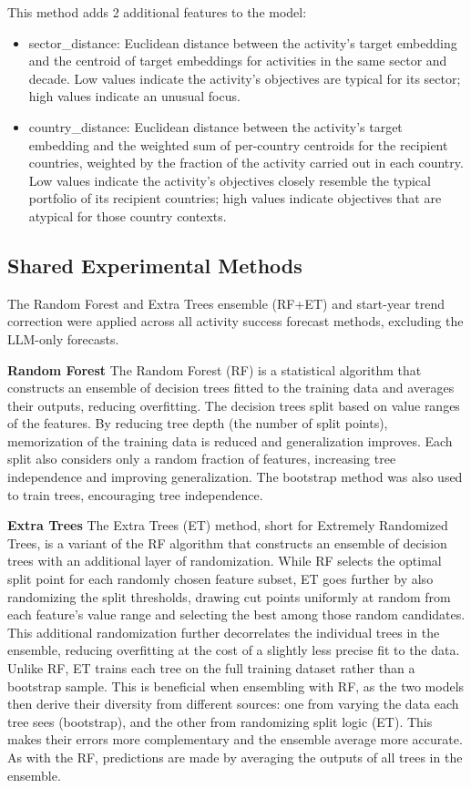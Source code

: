 \documentclass[12pt,a4paper]{article}
\begin{document}
This method adds 2 additional features to the model:
\begin{itemize}
  \item sector\_distance: Euclidean distance between the activity's target embedding and the centroid of target embeddings for activities in the same sector and decade. Low values indicate the activity's objectives are typical for its sector; high values indicate an unusual focus.
  \item country\_distance: Euclidean distance between the activity's target embedding and the weighted sum of per-country centroids for the recipient countries, weighted by the fraction of the activity carried out in each country. Low values indicate the activity's objectives closely resemble the typical portfolio of its recipient countries; high values indicate objectives that are atypical for those country contexts.
\end{itemize}



\subsection{Shared Experimental Methods}

The Random Forest and Extra Trees ensemble (RF+ET) and start-year trend correction were applied across all activity success forecast methods, excluding the LLM-only forecasts.

\textbf{Random Forest}
The Random Forest (RF) is a statistical algorithm that constructs an ensemble of decision trees fitted to the training data and averages their outputs, reducing overfitting. The decision trees split based on value ranges of the features. By reducing tree depth (the number of split points), memorization of the training data is reduced and generalization improves. Each split also considers only a random fraction of features, increasing tree independence and improving generalization. The bootstrap method was also used to train trees, encouraging tree independence.

\textbf{Extra Trees}
The Extra Trees (ET) method, short for Extremely Randomized Trees, is a variant of the RF algorithm that constructs an ensemble of decision trees with an additional layer of randomization. While RF selects the optimal split point for each randomly chosen feature subset, ET goes further by also randomizing the split thresholds, drawing cut points uniformly at random from each feature's value range and selecting the best among those random candidates. This additional randomization further decorrelates the individual trees in the ensemble, reducing overfitting at the cost of a slightly less precise fit to the data. Unlike RF, ET trains each tree on the full training dataset rather than a bootstrap sample. This is beneficial when ensembling with RF, as the two models then derive their diversity from different sources: one from varying the data each tree sees (bootstrap), and the other from randomizing split logic (ET). This makes their errors more complementary and the ensemble average more accurate. As with the RF, predictions are made by averaging the outputs of all trees in the ensemble.
\end{document}
